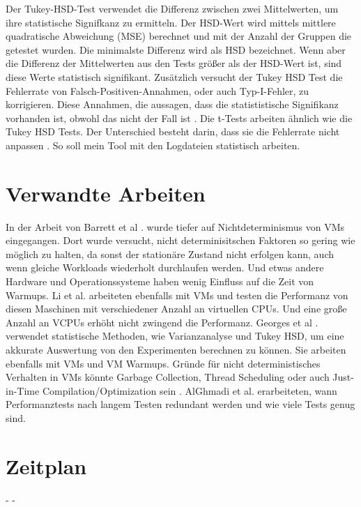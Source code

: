 \documentclass{article}
\begin{document}
Der Tukey-HSD-Test verwendet die Differenz zwischen zwei Mittelwerten, um ihre statistische Signifkanz zu ermitteln.
Der HSD-Wert wird mittels mittlere quadratische Abweichung (MSE) berechnet und mit der Anzahl der Gruppen die getestet wurden.
Die minimalste Differenz wird als HSD bezeichnet. Wenn aber die Differenz der Mittelwerten aus den Tests größer als der HSD-Wert ist, sind diese Werte statistisch signifikant. Zusätzlich versucht der Tukey HSD Test die Fehlerrate von Falsch-Positiven-Annahmen, oder auch Typ-I-Fehler, zu korrigieren. Diese Annahmen, die aussagen, dass die statististische Signifikanz vorhanden ist, obwohl das nicht der Fall ist \cite{fastcapital_TukeysHSD}.
Die t-Tests arbeiten ähnlich wie die Tukey HSD Tests. Der Unterschied besteht darin, dass sie die Fehlerrate nicht anpassen \cite{schmidtPaul} \cite{tukeyhsdwiki}.
So soll mein Tool mit den Logdateien statistisch arbeiten.

\section{Verwandte Arbeiten}
In der Arbeit von Barrett et al \cite{vmsHotandCold}. wurde tiefer auf Nichtdeterminismus von VMs eingegangen.
Dort wurde versucht, nicht determinisitschen Faktoren so gering wie möglich zu halten, da sonst der stationäre Zustand nicht erfolgen kann, auch wenn gleiche Workloads wiederholt durchlaufen werden. Und etwas andere Hardware und Operationssysteme haben wenig Einfluss auf die Zeit von Warmups. Li et al. \cite{9256518} arbeiteten ebenfalls mit VMs und testen die Performanz von diesen Maschinen mit verschiedener Anzahl an virtuellen CPUs. Und eine große Anzahl an VCPUs erhöht nicht zwingend die Performanz.
Georges et al \cite{10.1145/1297027.1297033}. verwendet statistische Methoden, wie Varianzanalyse und Tukey HSD, um eine akkurate Auswertung von den Experimenten berechnen zu können. Sie arbeiten ebenfalls mit VMs und VM Warmups.
Gründe für nicht deterministisches Verhalten in VMs könnte Garbage Collection, Thread Scheduling oder auch Just-in-Time Compilation/Optimization sein \cite{stasticsInPerformance}.
AlGhmadi et al. erarbeiteten, wann Performanztests nach langem Testen redundant werden und wie viele Tests genug sind.
 
\newpage
\section{Zeitplan}
- - 
{}

\end{document}
